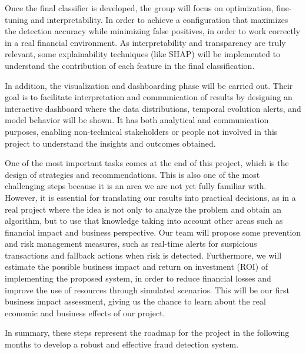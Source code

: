 \documentclass[12pt]{report} %
\begin{document}
Once the final classifier is developed, the group will focus on optimization, fine-tuning and interpretability. In order to achieve a configuration that maximizes the detection accuracy while minimizing false positives, in order to work correctly in a real financial environment. As interpretability and transparency are truly relevant, some explainability techniques (like SHAP) will be implemented to understand the contribution of each feature in the final classification.

In addition, the visualization and dashboarding phase will be carried out. Their goal is to facilitate interpretation and communication of results by designing an interactive dashboard where the data distributions, temporal evolution alerts, and model behavior will be shown. It has both analytical and communication purposes, enabling non-technical stakeholders or people not involved in this project to understand the insights and outcomes obtained. 

One of the most important tasks comes at the end of this project, which is the design of strategies and recommendations. This is also one of the most challenging steps because it is an area we are not yet fully familiar with. However, it is essential for translating our results into practical decisions, as in a real project where the idea is not only to analyze the problem and obtain an algorithm, but to use that knowledge taking into account other areas such as financial impact and business perspective. Our team will propose some prevention and risk management measures, such as real-time alerts for suspicious transactions and fallback actions when risk is detected. Furthermore, we will estimate the possible business impact and return on investment (ROI) of implementing the proposed system, in order to reduce financial losses and improve the use of resources through simulated scenarios. This will be our first business impact assessment, giving us the chance to learn about the real economic and business effects of our project.

In summary, these steps represent the roadmap for the project in the following months to develop a robust and effective fraud detection system.



\end{document}

